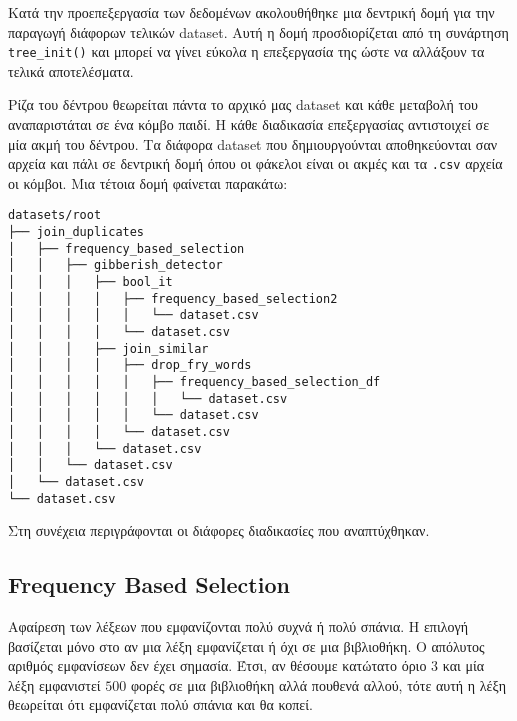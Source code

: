 Κατά την προεπεξεργασία των δεδομένων ακολουθήθηκε μια δεντρική δομή για την παραγωγή διάφορων τελικών dataset.
Αυτή η δομή προσδιορίζεται από τη συνάρτηση \lstinline!tree_init()!
και μπορεί να γίνει εύκολα η επεξεργασία της ώστε να αλλάξουν τα τελικά αποτελέσματα.

Ρίζα του δέντρου θεωρείται πάντα το αρχικό μας dataset και κάθε μεταβολή του αναπαριστάται σε ένα κόμβο παιδί.
Η κάθε διαδικασία επεξεργασίας αντιστοιχεί σε μία ακμή του δέντρου.
Τα διάφορα dataset που δημιουργούνται αποθηκεύονται σαν αρχεία και πάλι σε δεντρική δομή όπου οι φάκελοι είναι οι ακμές και τα \texttt{.csv} αρχεία οι κόμβοι.
Μια τέτοια δομή φαίνεται παρακάτω:
\begin{Verbatim}[frame=single]
datasets/root
├── join_duplicates
│   ├── frequency_based_selection
│   │   ├── gibberish_detector
│   │   │   ├── bool_it
│   │   │   │   ├── frequency_based_selection2
│   │   │   │   │   └── dataset.csv
│   │   │   │   └── dataset.csv
│   │   │   ├── join_similar
│   │   │   │   ├── drop_fry_words
│   │   │   │   │   ├── frequency_based_selection_df
│   │   │   │   │   │   └── dataset.csv
│   │   │   │   │   └── dataset.csv
│   │   │   │   └── dataset.csv
│   │   │   └── dataset.csv
│   │   └── dataset.csv
│   └── dataset.csv
└── dataset.csv
\end{Verbatim}

Στη συνέχεια περιγράφονται οι διάφορες διαδικασίες που αναπτύχθηκαν.

\subsection{Frequency Based Selection}
Αφαίρεση των λέξεων που εμφανίζονται πολύ συχνά ή πολύ σπάνια.
Η επιλογή βασίζεται μόνο στο αν μια λέξη εμφανίζεται ή όχι σε μια βιβλιοθήκη.
Ο απόλυτος αριθμός εμφανίσεων δεν έχει σημασία.
Έτσι, αν θέσουμε κατώτατο όριο $3$ και μία λέξη εμφανιστεί $500$ φορές σε μια βιβλιοθήκη αλλά πουθενά αλλού, τότε αυτή η λέξη θεωρείται ότι εμφανίζεται πολύ σπάνια και θα κοπεί.

